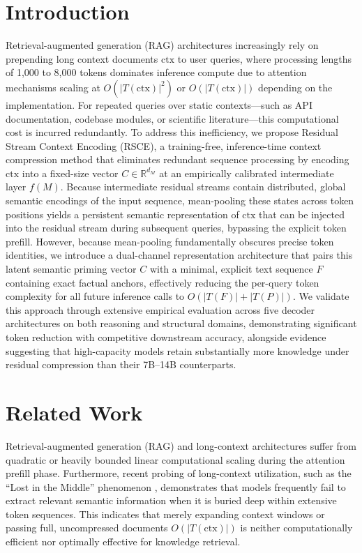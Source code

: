 \documentclass[11pt]{article}
\newcommand{\ctx}{\mathrm{ctx}}
\begin{document}
\section{Introduction}

Retrieval-augmented generation (RAG) architectures increasingly rely on prepending long context documents $\ctx$ to user queries, where processing lengths of 1,000 to 8,000 tokens dominates inference compute due to attention mechanisms scaling at $O(|T(\ctx)|^2)$ or $O(|T(\ctx)|)$ depending on the implementation. For repeated queries over static contexts---such as API documentation, codebase modules, or scientific literature---this computational cost is incurred redundantly. To address this inefficiency, we propose Residual Stream Context Encoding (RSCE), a training-free, inference-time context compression method that eliminates redundant sequence processing by encoding $\ctx$ into a fixed-size vector $C \in \mathbb{R}^{d_M}$ at an empirically calibrated intermediate layer $f(M)$. Because intermediate residual streams contain distributed, global semantic encodings of the input sequence, mean-pooling these states across token positions yields a persistent semantic representation of $\ctx$ that can be injected into the residual stream during subsequent queries, bypassing the explicit token prefill. However, because mean-pooling fundamentally obscures precise token identities, we introduce a dual-channel representation architecture that pairs this latent semantic priming vector $C$ with a minimal, explicit text sequence $F$ containing exact factual anchors, effectively reducing the per-query token complexity for all future inference calls to $O(|T(F)| + |T(P)|)$. We validate this approach through extensive empirical evaluation across five decoder architectures on both reasoning and structural domains, demonstrating significant token reduction with competitive downstream accuracy, alongside evidence suggesting that high-capacity models retain substantially more knowledge under residual compression than their 7B--14B counterparts.

\section{Related Work}
\label{sec:related}

Retrieval-augmented generation (RAG) and long-context architectures suffer from quadratic or heavily bounded linear computational scaling during the attention prefill phase. Furthermore, recent probing of long-context utilization, such as the ``Lost in the Middle'' phenomenon \cite{liu2023lost}, demonstrates that models frequently fail to extract relevant semantic information when it is buried deep within extensive token sequences. This indicates that merely expanding context windows or passing full, uncompressed documents $O(|T(\ctx)|)$ is neither computationally efficient nor optimally effective for knowledge retrieval.
\end{document}
